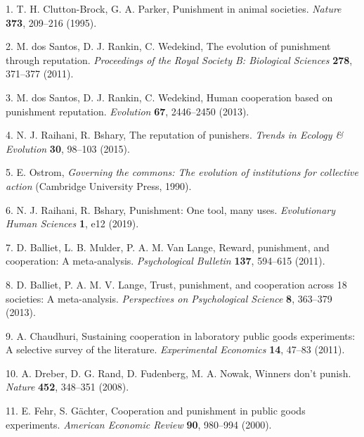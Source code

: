 \documentclass[
  english,
  man, donotrepeattitle,floatsintext]{apa6}
\newenvironment{cslreferences}%
  {}%
  {\par}
\begin{document}
\hypertarget{refs}{}
\begin{cslreferences}
\leavevmode\hypertarget{ref-CluttonBrock1995}{}%
1. T. H. Clutton-Brock, G. A. Parker, Punishment in animal societies. \emph{Nature} \textbf{373}, 209--216 (1995).

\leavevmode\hypertarget{ref-DosSantos2011}{}%
2. M. dos Santos, D. J. Rankin, C. Wedekind, The evolution of punishment through reputation. \emph{Proceedings of the Royal Society B: Biological Sciences} \textbf{278}, 371--377 (2011).

\leavevmode\hypertarget{ref-DosSantos2013}{}%
3. M. dos Santos, D. J. Rankin, C. Wedekind, Human cooperation based on punishment reputation. \emph{Evolution} \textbf{67}, 2446--2450 (2013).

\leavevmode\hypertarget{ref-Raihani2015}{}%
4. N. J. Raihani, R. Bshary, The reputation of punishers. \emph{Trends in Ecology \& Evolution} \textbf{30}, 98--103 (2015).

\leavevmode\hypertarget{ref-Ostrom1990}{}%
5. E. Ostrom, \emph{Governing the commons: The evolution of institutions for collective action} (Cambridge University Press, 1990).

\leavevmode\hypertarget{ref-Raihani2019}{}%
6. N. J. Raihani, R. Bshary, Punishment: One tool, many uses. \emph{Evolutionary Human Sciences} \textbf{1}, e12 (2019).

\leavevmode\hypertarget{ref-Balliet2011}{}%
7. D. Balliet, L. B. Mulder, P. A. M. Van Lange, Reward, punishment, and cooperation: A meta-analysis. \emph{Psychological Bulletin} \textbf{137}, 594--615 (2011).

\leavevmode\hypertarget{ref-Balliet2013}{}%
8. D. Balliet, P. A. M. V. Lange, Trust, punishment, and cooperation across 18 societies: A meta-analysis. \emph{Perspectives on Psychological Science} \textbf{8}, 363--379 (2013).

\leavevmode\hypertarget{ref-Chaudhuri2011}{}%
9. A. Chaudhuri, Sustaining cooperation in laboratory public goods experiments: A selective survey of the literature. \emph{Experimental Economics} \textbf{14}, 47--83 (2011).

\leavevmode\hypertarget{ref-Dreber2008}{}%
10. A. Dreber, D. G. Rand, D. Fudenberg, M. A. Nowak, Winners don't punish. \emph{Nature} \textbf{452}, 348--351 (2008).

\leavevmode\hypertarget{ref-Fehr2000}{}%
11. E. Fehr, S. Gächter, Cooperation and punishment in public goods experiments. \emph{American Economic Review} \textbf{90}, 980--994 (2000).


\end{cslreferences}
\end{document}
